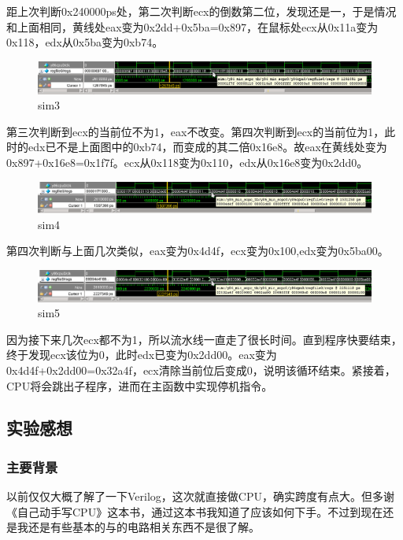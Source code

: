 \documentclass[12pt]{article}
\begin{document}
\begin{CJK*}{GB}{gbsn}
距上次判断0x240000ps处，第二次判断ecx的倒数第二位，发现还是一，于是情况和上面相同，黄线处eax变为0x2dd+0x5ba=0x897，在鼠标处ecx从0x11a变为0x118，edx从0x5ba变为0xb74。

\begin{figure}[htbp]
\centering
\includegraphics{img/sim3.png}
\caption{sim3}
\end{figure}

第三次判断到ecx的当前位不为1，eax不改变。第四次判断到ecx的当前位为1，此时的edx已不是上面图中的0xb74，而变成的其二倍0x16e8。故eax在黄线处变为0x897+0x16e8=0x1f7f。ecx从0x118变为0x110，edx从0x16e8变为0x2dd0。

\begin{figure}[htbp]
\centering
\includegraphics{img/sim4.png}
\caption{sim4}
\end{figure}

第四次判断与上面几次类似，eax变为0x4d4f，ecx变为0x100,edx变为0x5ba00。

\begin{figure}[htbp]
\centering
\includegraphics{img/sim5.png}
\caption{sim5}
\end{figure}

因为接下来几次ecx都不为1，所以流水线一直走了很长时间。直到程序快要结束，终于发现ecx该位为0，此时edx已变为0x2dd00。eax变为0x4d4f+0x2dd00=0x32a4f，ecx清除当前位后变成0，说明该循环结束。紧接着，CPU将会跳出子程序，进而在主函数中实现停机指令。

\subsection{实验感想}\label{ux5b9eux9a8cux611fux60f3}

\subsubsection{主要背景}\label{ux4e3bux8981ux80ccux666f}

以前仅仅大概了解了一下Verilog，这次就直接做CPU，确实跨度有点大。但多谢《自己动手写CPU》这本书，通过这本书我知道了应该如何下手。不过到现在还是我还是有些基本的与的电路相关东西不是很了解。


\end{CJK*}
\end{document}

